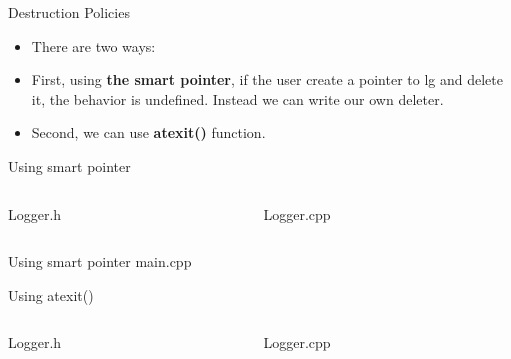 \documentclass[13pt]{beamer}
\begin{document}
\begin{frame}{Destruction Policies}
\begin{itemize}
\setlength\itemsep{1em}

\item There are two ways:

\item First, using \textbf{the smart pointer}, if the user create a pointer to lg and delete it, the behavior is undefined. Instead we can write our own deleter.

\item Second, we can use \textbf{atexit()} function.
\end{itemize}
\end{frame}

\begin{frame}{Using smart pointer}
\begin{columns}[T]
\begin{column}{.45\textwidth}
Logger.h
\lstset{basicstyle=\tiny,style=myCustomCppStyle}

\end{column}

\begin{column}{.45\textwidth}
Logger.cpp
\lstset{basicstyle=\tiny,style=myCustomCppStyle}

\end{column}
\end{columns}
\end{frame}

\begin{frame}{Using smart pointer}
main.cpp
\lstset{basicstyle=\tiny,style=myCustomCppStyle}

\end{frame}

\begin{frame}{Using atexit()}
\begin{columns}[T]
\begin{column}{.45\textwidth}
Logger.h
\lstset{basicstyle=\tiny,style=myCustomCppStyle}

\end{column}

\begin{column}{.45\textwidth}
Logger.cpp
\lstset{basicstyle=\tiny,style=myCustomCppStyle}

\end{column}
\end{columns}
\end{frame}
\end{document}
